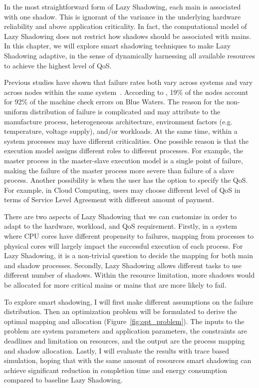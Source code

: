 In the most straightforward form of Lazy Shadowing, each main is associated with one shadow. This is ignorant of the variance in the underlying hardware reliability and above application criticality. In fact, the computational model of Lazy Shadowing does not restrict how shadows should be associated with mains. In this chapter, we will explore smart shadowing techniques to make Lazy Shadowing adaptive, in the sense of dynamically harnessing all available resources to achieve the highest level of QoS. 

Previous studies have shown that failure rates both vary across systems and vary across nodes within the same system~\cite{schroeder2007,di2014lessons}. According to \cite{di2014lessons}, 19\% of the nodes account for 92\% of the machine check errors on Blue Waters. The reason for the non-uniform distribution of failure is complicated and may attribute to the manufacture process, heterogeneous architecture, environment factors (e.g. temperature, voltage supply), and/or workloads. At the same time, within a system processes may have different criticalities. One possible reason is that the execution model assigns different roles to different processes. For example, the master process in the master-slave execution model is a single point of failure, making the failure of the master process more severe than failure of a slave process. Another possibility is when the user has the option to specify the QoS. For example, in Cloud Computing, users may choose different level of QoS in terms of Service Level Agreement with different amount of payment. 

There are two aspects of Lazy Shadowing that we can customize in order to adapt to the hardware, workload, and QoS requirement. Firstly, in a system where CPU cores have different propensity to failures, mapping from processes to physical cores will largely impact the successful execution of each process. For Lazy Shadowing, it is a non-trivial question to decide the mapping for both main and shadow processes. Secondly, Lazy Shadowing allows different tasks to use different number of shadows. Within the resource limitation, more shadows would be allocated for more critical mains or mains that are more likely to fail. 

To explore smart shadowing, %
I will first make different assumptions on the failure distribution. 
Then an optimization problem will be formulated to derive the optimal mapping and allocation (Figure~\ref{fig:opt_problem}). The inputs to the problem are system parameters and application parameters, the constraints are deadlines and limitation on resources, and the output are the process mapping and shadow allocation. Lastly, I will evaluate the results with trace based simulation, hoping that with the same amount of resources smart shadowing can achieve significant reduction in completion time and energy consumption compared to baseline Lazy Shadowing.

